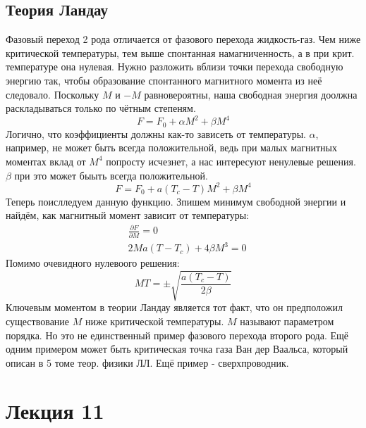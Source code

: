 \documentclass[a4paper, 12pt]{article}
\begin{document}
	\subsection{Теория Ландау}
	Фазовый переход 2 рода отличается от фазового перехода жидкость-газ. Чем ниже критической температуры, тем выше спонтанная намагниченность, а в при крит. температуре она нулевая. Нужно разложить вблизи точки перехода свободную энергию так, чтобы образование спонтанного магнитного момента из неё следовало. Поскольку $M$ и $-M$ равновероятны, наша свободная энергия доолжна раскладываться только по чётным степеням.
	\begin{equation*}
		F = F_{0} + \alpha M^{2} + \beta M^{4}
	\end{equation*}
	Логично, что коэффициенты должны как-то зависеть от температуры. $\alpha$, например, не может быть всегда положительной, ведь при малых магнитных моментах вклад от $M^{4}$ попросту исчезнет, а нас интересуют ненулевые решения.  $\beta$ при это может быыть всегда положительной.
	\begin{equation*}
		F = F_{0} + a (T_{c} - T) M^{2} + \beta M^{4}
	\end{equation*}
	Теперь поислледуем данную функцию. Зпишем минимум свободной энергии и найдём, как магнитный момент зависит от температуры:
	\begin{equation*}
		\begin{aligned}
			& \frac{\partial F}{\partial M} = 0 \\
			& 2Ma(T-T_{c}) + 4 \beta M^{3} = 0  
		\end{aligned}
	\end{equation*}
	Помимо очевидного нулевоого решения:
	\begin{equation*}
		MT = \pm \sqrt{\frac{a(T_{c} - T)}{2 \beta}}	
	\end{equation*}
	Ключевым моментом в теории Ландау является тот факт, что он предположил существование $M$ ниже критической температуры. $M$ называют параметром порядка. Но это не единственный пример фазового перехода второго рода. Ещё одним примером может быть критическая точка газа Ван дер Ваальса, который описан в 5 томе теор. физики ЛЛ. Ещё пример - сверхпроводник.
	\section{Лекция 11}
\end{document}
